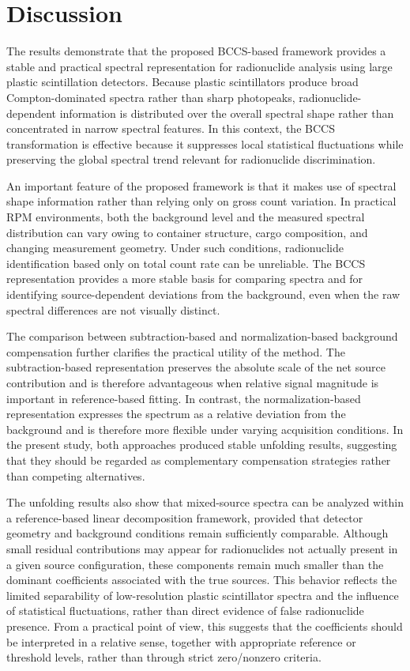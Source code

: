 \documentclass[fleqn, 10pt]{wlscirep}
\begin{document}
\section*{Discussion}


The results demonstrate that the proposed BCCS-based framework provides a stable and practical spectral representation for radionuclide analysis using large plastic scintillation detectors. Because plastic scintillators produce broad Compton-dominated spectra rather than sharp photopeaks, radionuclide-dependent information is distributed over the overall spectral shape rather than concentrated in narrow spectral features. In this context, the BCCS transformation is effective because it suppresses local statistical fluctuations while preserving the global spectral trend relevant for radionuclide discrimination.

An important feature of the proposed framework is that it makes use of spectral shape information rather than relying only on gross count variation. In practical RPM environments, both the background level and the measured spectral distribution can vary owing to container structure, cargo composition, and changing measurement geometry. Under such conditions, radionuclide identification based only on total count rate can be unreliable. The BCCS representation provides a more stable basis for comparing spectra and for identifying source-dependent deviations from the background, even when the raw spectral differences are not visually distinct.

The comparison between subtraction-based and normalization-based background compensation further clarifies the practical utility of the method. The subtraction-based representation preserves the absolute scale of the net source contribution and is therefore advantageous when relative signal magnitude is important in reference-based fitting. In contrast, the normalization-based representation expresses the spectrum as a relative deviation from the background and is therefore more flexible under varying acquisition conditions. In the present study, both approaches produced stable unfolding results, suggesting that they should be regarded as complementary compensation strategies rather than competing alternatives.

The unfolding results also show that mixed-source spectra can be analyzed within a reference-based linear decomposition framework, provided that detector geometry and background conditions remain sufficiently comparable. Although small residual contributions may appear for radionuclides not actually present in a given source configuration, these components remain much smaller than the dominant coefficients associated with the true sources. This behavior reflects the limited separability of low-resolution plastic scintillator spectra and the influence of statistical fluctuations, rather than direct evidence of false radionuclide presence. From a practical point of view, this suggests that the coefficients should be interpreted in a relative sense, together with appropriate reference or threshold levels, rather than through strict zero/nonzero criteria.
\end{document}
